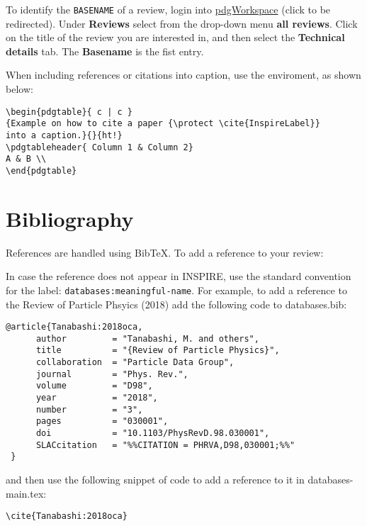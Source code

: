 To identify the {\tt BASENAME} of a review, login into \href{https://pdgprod.lbl.gov/pdgprod/PdgWorkspace/Reviews.action}{pdgWorkspace} (click to be redirected). Under \textbf{Reviews} select from the drop-down menu \textbf{all reviews}. Click on the title of the review you are interested in, and then select the \textbf{Technical details} tab. The \textbf{Basename} is the fist entry.

When including references or citations into caption, use the {\tt \string\protect} enviroment, as shown below:
\begin{verbatim}
\begin{pdgtable}{ c | c }
{Example on how to cite a paper {\protect \cite{InspireLabel}}
into a caption.}{}{ht!} 
\pdgtableheader{ Column 1 & Column 2}
A & B \\
\end{pdgtable}
\end{verbatim}



\section{Bibliography}

References are handled using BibTeX. To add a reference to your review:
In case the reference does not appear in INSPIRE, use the standard convention for the label: {\tt databases:meaningful-name}.
For example, to add a reference to the Review of Particle Phsyics (2018) 
add the following code to databases.bib:
\begin{verbatim}
@article{Tanabashi:2018oca,
      author         = "Tanabashi, M. and others",
      title          = "{Review of Particle Physics}",
      collaboration  = "Particle Data Group",
      journal        = "Phys. Rev.",
      volume         = "D98",
      year           = "2018",
      number         = "3",
      pages          = "030001",
      doi            = "10.1103/PhysRevD.98.030001",
      SLACcitation   = "%%CITATION = PHRVA,D98,030001;%%"
 }
\end{verbatim}
and then use the following snippet of code to add a reference to it in databases-main.tex:
\begin{verbatim}
\cite{Tanabashi:2018oca}
\end{verbatim}



